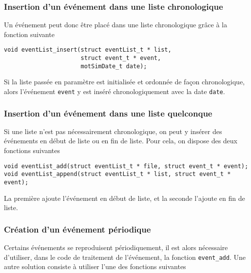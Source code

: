 \subsubsection{Insertion d'un événement dans une liste chronologique}

   Un événement peut donc être placé dans une liste chronologique
grâce à la fonction suivante

\begin{verbatim}
void eventList_insert(struct eventList_t * list,
                      struct event_t * event,
                      motSimDate_t date);
\end{verbatim}

   Si la liste passée en paramètre est initialisée et ordonnée de
façon chronologique, alors l'événement \lstinline!event! y est inséré
chronologiquement avec la date \lstinline!date!.

%
\subsubsection{Insertion d'un événement dans une liste quelconque}

   Si une liste n'est pas nécessairement chronologique, on peut y
insérer des événements en début de liste ou en fin de liste. Pour
cela, on dispose des deux fonctions suivantes

\begin{verbatim}
void eventList_add(struct eventList_t * file, struct event_t * event);
void eventList_append(struct eventList_t * list, struct event_t * event);
\end{verbatim}

  La première ajoute l'événement en début de liste, et la seconde
l'ajoute en fin de liste.

%
\subsubsection{Création d'un événement périodique}

   Certains événements se reproduisent périodiquement, il est alors
nécessaire d'utiliser, dans le code de traitement de l'événement, la
fonction {\tt event\_add}. Une autre solution consiste à utiliser
l'une des fonctions suivantes 

